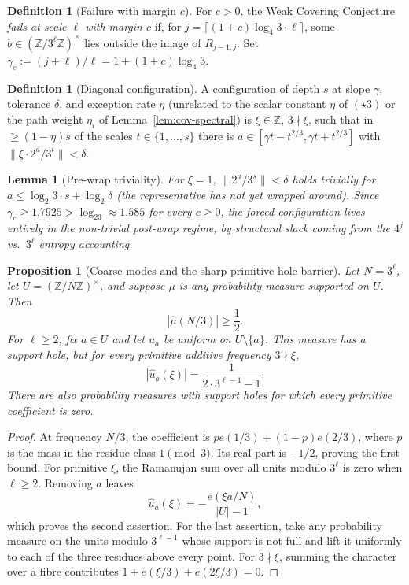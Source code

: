\documentclass[11pt]{article}
\newtheorem{proposition}[theorem]{Proposition}
\newtheorem{lemma}[theorem]{Lemma}
\theoremstyle{definition}
\newtheorem{definition}[theorem]{Definition}
\theoremstyle{remark}
\newcommand{\ZZ}{\mathbb{Z}}
\begin{document}
\begin{definition}[Failure with margin $c$]
For $c>0$, the Weak Covering Conjecture \emph{fails at scale $\ell$
with margin $c$} if, for $j=\lceil(1+c)\log_4 3\cdot\ell\rceil$, some
$b\in(\mathbb{Z}/3^\ell\mathbb{Z})^\times$ lies outside the image of
$R_{j-1,j}$. Set $\gamma_c := (j+\ell)/\ell = 1+(1+c)\log_4 3$.
\end{definition}

\begin{definition}[Diagonal configuration]
A configuration of depth $s$ at slope $\gamma$, tolerance $\delta$, and
exception rate $\eta$ (unrelated to the scalar constant $\eta$ of
$(\star3)$ or the path weight $\eta_i$ of Lemma~\ref{lem:cov-spectral})
is $\xi\in\ZZ$, $3\nmid\xi$, such that in
$\ge(1-\eta)s$ of the scales $t\in\{1,\dots,s\}$ there is
$a\in[\gamma t - t^{2/3}, \gamma t+t^{2/3}]$ with
$\|\xi\cdot 2^a/3^t\|<\delta$.
\end{definition}

\begin{lemma}[Pre-wrap triviality]
For $\xi=1$, $\|2^a/3^s\|<\delta$ holds trivially for
$a\le\log_2 3\cdot s+\log_2\delta$ (the representative has not yet
wrapped around). Since $\gamma_c\ge 1.7925>\log_23\approx 1.585$ for
every $c\ge 0$, the forced configuration lives entirely in the
non-trivial post-wrap regime, by structural slack coming from the
$4^j$ vs.\ $3^\ell$ entropy accounting.
\end{lemma}

\begin{proposition}[Coarse modes and the sharp primitive hole barrier]
\label{prop:primitive-hole}
Let $N=3^\ell$, let $U=(\mathbb Z/N\mathbb Z)^\times$, and suppose
$\mu$ is any probability measure supported on $U$. Then
\[
 |\widehat\mu(N/3)|\ge\frac12.
\]
For $\ell\ge2$, fix $a\in U$ and let $u_a$ be uniform on
$U\setminus\{a\}$. This measure has a support hole, but for every
primitive additive frequency $3\nmid\xi$,
\[
 |\widehat u_a(\xi)|=\frac{1}{2\cdot3^{\ell-1}-1}.
\]
There are also probability measures with support holes for which every
primitive coefficient is zero.
\end{proposition}

\begin{proof}
At frequency $N/3$, the coefficient is
$p e(1/3)+(1-p)e(2/3)$, where $p$ is the mass in the residue class
$1\pmod3$. Its real part is $-1/2$, proving the first bound. For
primitive $\xi$, the Ramanujan sum over all units modulo $3^\ell$ is
zero when $\ell\ge2$. Removing $a$ leaves
\[
 \widehat u_a(\xi)=-\frac{e(\xi a/N)}{|U|-1},
\]
which proves the second assertion.
For the last assertion, take any probability measure on the units
modulo $3^{\ell-1}$ whose support is not full and lift it uniformly to
each of the three residues above every point. For $3\nmid\xi$, summing
the character over a fibre contributes
$1+e(\xi/3)+e(2\xi/3)=0$.
\end{proof}
\end{document}
